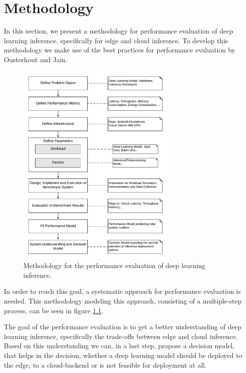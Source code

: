 \chapter{Methodology}
\label{chap:methodology}

In this section, we present a methodology for performance evaluation of deep learning inference, specifically for edge and cloud inference.
To develop this methodology we make use of the best practices for performance evaluation by Ousterhout \cite{Ousterhout:2018:AMO:3234519.3213770} and Jain\cite{books/daglib/0076234}.


\begin{figure}[!htb]
\centering
\includegraphics[width=0.7\textwidth]{./Bilder/Methodology.pdf}
\caption{Methodology for the performance evaluation of deep learning inference.}
\label{fig:Methodology}
\end{figure}
In order to reach this goal, a systematic approach for performance evaluation is needed.
This methodology modeling this approach, consisting of a multiple-step process, can be seen in figure \ref{fig:Methodology}. 


The goal of the performance evaluation is to get a better understanding of deep learning inference, specifically the trade-offs between edge and cloud inference.
Based on this understanding we can, in a last step, propose a decision model, that helps in the decision, whether a deep learning model should be deployed to the edge, to a cloud-backend or is not feasible for deployment at all.


